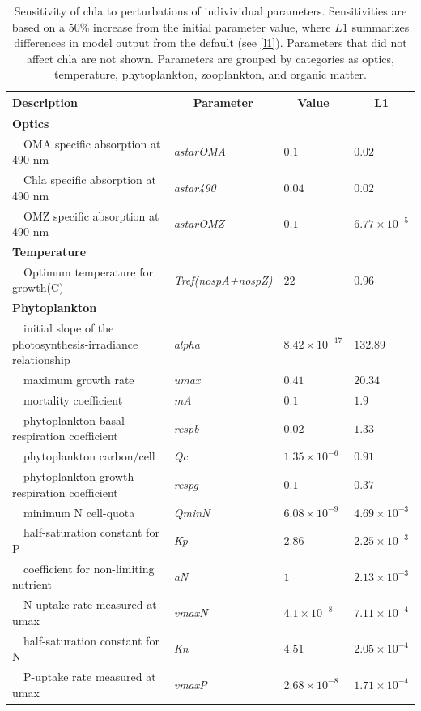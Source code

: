 \documentclass[letterpaper,12pt,oneside]{article}\usepackage[]{graphicx}\usepackage[]{color}
\begin{document}
\begin{table}[!tbp]
{\footnotesize
\caption{Sensitivity of \ac{chla} to perturbations of indivividual parameters.  Sensitivities are based on a 50\% increase from the initial parameter value, where $L1$ summarizes differences in model output from the default (see \cref{l1}).  Parameters that did not affect \ac{chla} are not shown.  Parameters are grouped by categories as optics, temperature, phytoplankton, zooplankton, and organic matter.\label{tab:chlsens}} 
\begin{center}
\begin{tabular}{llll}
\hline\hline
\multicolumn{1}{l}{Description}&\multicolumn{1}{c}{Parameter}&\multicolumn{1}{c}{Value}&\multicolumn{1}{c}{L1}\tabularnewline
\hline
{\bfseries Optics}&&&\tabularnewline
~~OMA specific absorption at 490 nm&\textit{astarOMA}&$0.1$&$0.02$\tabularnewline
~~Chla specific absorption at 490 nm&\textit{astar490}&$0.04$&$0.02$\tabularnewline
~~OMZ specific absorption at 490 nm&\textit{astarOMZ}&$0.1$&$6.77\times 10^{-5}$\tabularnewline
\hline
{\bfseries Temperature}&&&\tabularnewline
~~Optimum temperature for growth(C)&\textit{Tref(nospA+nospZ)}&$22$&$0.96$\tabularnewline
\hline
{\bfseries Phytoplankton}&&&\tabularnewline
~~initial slope of the photosynthesis-irradiance relationship&\textit{alpha}&$8.42\times 10^{-17}$&$132.89$\tabularnewline
~~maximum growth rate&\textit{umax}&$0.41$&$20.34$\tabularnewline
~~mortality coefficient&\textit{mA}&$0.1$&$1.9$\tabularnewline
~~phytoplankton basal respiration coefficient&\textit{respb}&$0.02$&$1.33$\tabularnewline
~~phytoplankton carbon/cell&\textit{Qc}&$1.35\times 10^{-6}$&$0.91$\tabularnewline
~~phytoplankton growth respiration coefficient&\textit{respg}&$0.1$&$0.37$\tabularnewline
~~minimum N cell-quota&\textit{QminN}&$6.08\times 10^{-9}$&$4.69\times 10^{-3}$\tabularnewline
~~half-saturation constant for P&\textit{Kp}&$2.86$&$2.25\times 10^{-3}$\tabularnewline
~~coefficient for non-limiting nutrient&\textit{aN}&$1$&$2.13\times 10^{-3}$\tabularnewline
~~N-uptake rate measured at umax&\textit{vmaxN}&$4.1\times 10^{-8}$&$7.11\times 10^{-4}$\tabularnewline
~~half-saturation constant for N&\textit{Kn}&$4.51$&$2.05\times 10^{-4}$\tabularnewline
~~P-uptake rate measured at umax&\textit{vmaxP}&$2.68\times 10^{-8}$&$1.71\times 10^{-4}$\tabularnewline

\end{tabular}
\end{center}}
\end{table}
\end{document}
